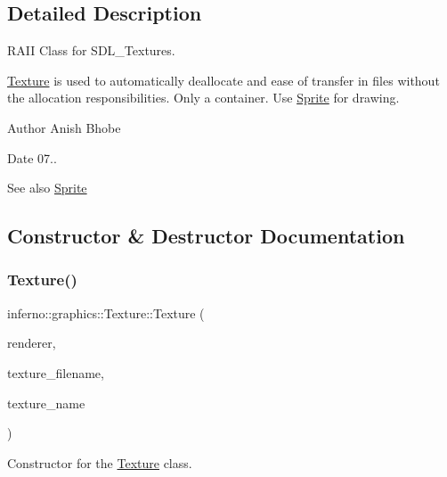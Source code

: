 \subsection{Detailed Description}
R\+A\+II Class for S\+D\+L\+\_\+\+Textures. 

\mbox{\hyperlink{classinferno_1_1graphics_1_1_texture}{Texture}} is used to automatically deallocate and ease of transfer in files without the allocation responsibilities. Only a container. Use \mbox{\hyperlink{classinferno_1_1graphics_1_1_sprite}{Sprite}} for drawing. \begin{DoxyAuthor}{Author}
Anish Bhobe 
\end{DoxyAuthor}
\begin{DoxyDate}{Date}
07.. 
\end{DoxyDate}
\begin{DoxySeeAlso}{See also}
\mbox{\hyperlink{classinferno_1_1graphics_1_1_sprite}{Sprite}} 
\end{DoxySeeAlso}


\subsection{Constructor \& Destructor Documentation}
\mbox{\label{classinferno_1_1graphics_1_1_texture_addc70b7b802cc870d9f4647cba3708ac}} 
\subsubsection{\texorpdfstring{Texture()}{Texture()}\hspace{0.1cm}{\footnotesize\ttfamily [1/2]}}
{\footnotesize\ttfamily inferno\+::graphics\+::\+Texture\+::\+Texture (\begin{DoxyParamCaption}\item[{S\+D\+L\+\_\+\+Renderer $\ast$}]{renderer,  }\item[{std\+::string}]{texture\+\_\+filename,  }\item[{std\+::string}]{texture\+\_\+name }\end{DoxyParamCaption})}



Constructor for the \mbox{\hyperlink{classinferno_1_1graphics_1_1_texture}{Texture}} class. 

